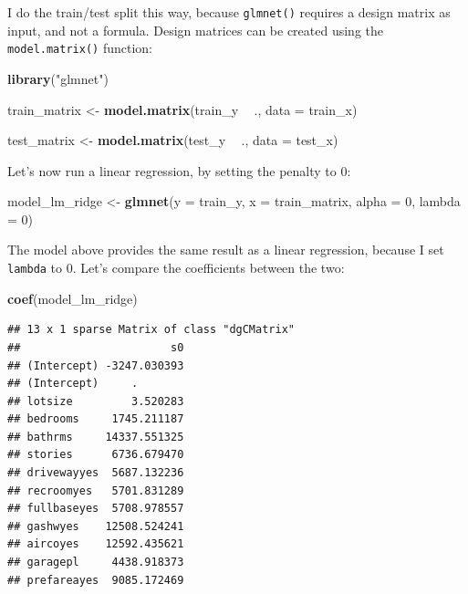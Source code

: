 \documentclass[]{gitbook}
\newenvironment{Shaded}{\begin{snugshade}}{\end{snugshade}}
\newcommand{\DataTypeTok}[1]{\textcolor[rgb]{0.13,0.29,0.53}{#1}}
\newcommand{\DecValTok}[1]{\textcolor[rgb]{0.00,0.00,0.81}{#1}}
\newcommand{\KeywordTok}[1]{\textcolor[rgb]{0.13,0.29,0.53}{\textbf{#1}}}
\newcommand{\NormalTok}[1]{#1}
\newcommand{\OperatorTok}[1]{\textcolor[rgb]{0.81,0.36,0.00}{\textbf{#1}}}
\newcommand{\StringTok}[1]{\textcolor[rgb]{0.31,0.60,0.02}{#1}}
\theoremstyle{definition}
\theoremstyle{definition}
\theoremstyle{definition}
\theoremstyle{remark}
\begin{document}
I do the train/test split this way, because \texttt{glmnet()} requires a
design matrix as input, and not a formula. Design matrices can be
created using the \texttt{model.matrix()} function:

\begin{Shaded}
\begin{Highlighting}[]
\KeywordTok{library}\NormalTok{(}\StringTok{"glmnet"}\NormalTok{)}

\NormalTok{train_matrix <-}\StringTok{ }\KeywordTok{model.matrix}\NormalTok{(train_y }\OperatorTok{~}\StringTok{ }\NormalTok{., }\DataTypeTok{data =}\NormalTok{ train_x)}

\NormalTok{test_matrix <-}\StringTok{ }\KeywordTok{model.matrix}\NormalTok{(test_y }\OperatorTok{~}\StringTok{ }\NormalTok{., }\DataTypeTok{data =}\NormalTok{ test_x)}
\end{Highlighting}
\end{Shaded}

Let's now run a linear regression, by setting the penalty to 0:

\begin{Shaded}
\begin{Highlighting}[]
\NormalTok{model_lm_ridge <-}\StringTok{ }\KeywordTok{glmnet}\NormalTok{(}\DataTypeTok{y =}\NormalTok{ train_y, }\DataTypeTok{x =}\NormalTok{ train_matrix, }\DataTypeTok{alpha =} \DecValTok{0}\NormalTok{, }\DataTypeTok{lambda =} \DecValTok{0}\NormalTok{)}
\end{Highlighting}
\end{Shaded}

The model above provides the same result as a linear regression, because
I set \texttt{lambda} to 0. Let's compare the coefficients between the
two:

\begin{Shaded}
\begin{Highlighting}[]
\KeywordTok{coef}\NormalTok{(model_lm_ridge)}
\end{Highlighting}
\end{Shaded}

\begin{verbatim}
## 13 x 1 sparse Matrix of class "dgCMatrix"
##                       s0
## (Intercept) -3247.030393
## (Intercept)     .       
## lotsize         3.520283
## bedrooms     1745.211187
## bathrms     14337.551325
## stories      6736.679470
## drivewayyes  5687.132236
## recroomyes   5701.831289
## fullbaseyes  5708.978557
## gashwyes    12508.524241
## aircoyes    12592.435621
## garagepl     4438.918373
## prefareayes  9085.172469
\end{verbatim}
\end{document}
